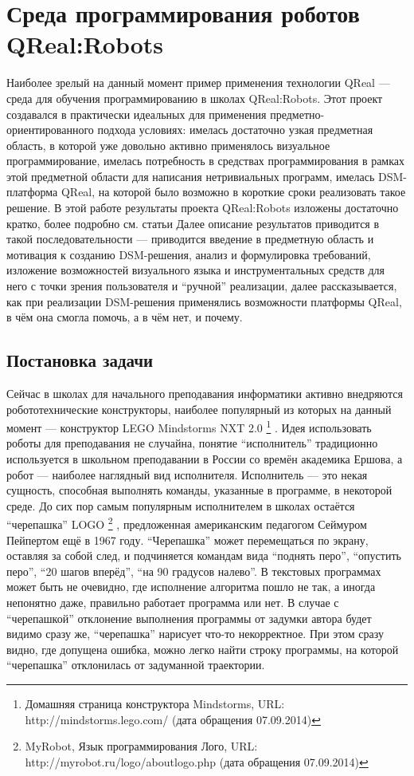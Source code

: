 \section{Среда программирования роботов QReal:Robots}
\label{chapter:qRealRobots}
Наиболее зрелый на данный момент пример применения технологии QReal --- среда для 
обучения программированию в школах QReal:Robots. Этот проект создавался в практически 
идеальных для применения предметно-ориентированного подхода условиях: имелась достаточно 
узкая предметная область, в которой уже довольно активно применялось визуальное программирование, 
имелась потребность в средствах программирования в рамках этой предметной области для 
написания нетривиальных программ, имелась DSM-платформа QReal, на которой было возможно 
в короткие сроки реализовать такое решение. В этой работе результаты проекта QReal:Robots изложены достаточно кратко, более подробно см. статьи
\cite{bryksin2011robots, tikhonova2012robots, litvinov2012robots, terekhov2013robots}
Далее описание результатов приводится в такой последовательности --- приводится введение 
в предметную область и мотивация к созданию DSM-решения, анализ и формулировка требований, 
изложение возможностей визуального языка и инструментальных средств для него с точки 
зрения пользователя и "`ручной"' реализации, далее рассказывается, как при реализации 
DSM-решения применялись возможности платформы QReal, в чём она смогла помочь, а в чём нет, и почему.

\subsection{Постановка задачи}
Сейчас в школах для начального преподавания информатики активно внедряются робототехнические 
конструкторы, наиболее популярный из которых на данный момент --- конструктор LEGO Mindstorms NXT 2.0%
\footnote{Домашняя страница конструктора Mindstorms, URL: http://mindstorms.lego.com/ (дата обращения 07.09.2014)}%
. Идея использовать роботы для преподавания не случайна, понятие "`исполнитель"' традиционно 
используется в школьном преподавании в России со времён академика Ершова, а робот --- наиболее 
наглядный вид исполнителя. Исполнитель --- это некая сущность, способная выполнять 
команды, указанные в программе, в некоторой среде. До сих пор самым популярным исполнителем 
в школах остаётся "`черепашка"' LOGO%
\footnote{MyRobot, Язык программирования Лого, URL: http://myrobot.ru/logo/aboutlogo.php (дата обращения 07.09.2014)}%
, предложенная американским педагогом Сеймуром Пейпертом ещё в 1967 году. "`Черепашка"' 
может перемещаться по экрану, оставляя за собой след, и подчиняется командам вида "`поднять перо"', 
"`опустить перо"', "`20 шагов вперёд"', "`на 90 градусов налево"'. В текстовых программах 
может быть не очевидно, где исполнение алгоритма пошло не так, а иногда непонятно 
даже, правильно работает программа или нет. В случае с "`черепашкой"' отклонение выполнения 
программы от задумки автора будет видимо сразу же, "`черепашка"' нарисует что-то некорректное. 
При этом сразу видно, где допущена ошибка, можно легко найти строку программы, на 
которой "`черепашка"' отклонилась от задуманной траектории.

